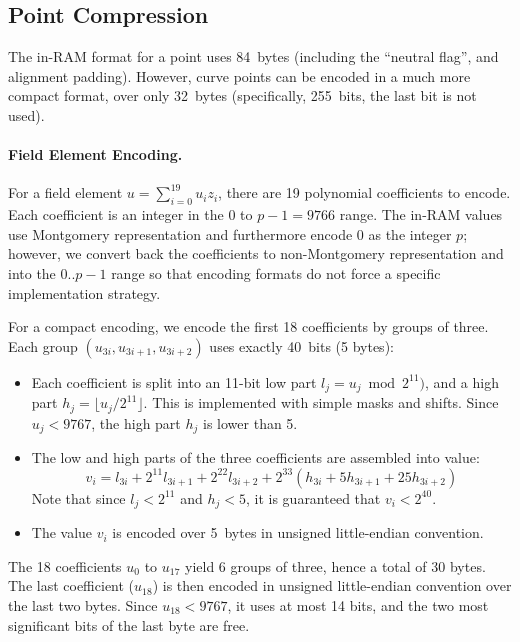 \documentclass{llncs}
\begin{document}
\subsection{Point Compression}

The in-RAM format for a point uses 84~bytes (including the ``neutral
flag'', and alignment padding). However, curve points can be encoded in
a much more compact format, over only 32~bytes (specifically, 255~bits,
the last bit is not used).

\paragraph{Field Element Encoding.}

For a field element $u = \sum_{i=0}^{19} u_i z_i$, there are 19
polynomial coefficients to encode. Each coefficient is an integer in
the $0$ to $p-1 = 9766$ range. The in-RAM values use Montgomery
representation and furthermore encode 0 as the integer $p$; however,
we convert back the coefficients to non-Montgomery representation and
into the $0$..$p-1$ range so that encoding formats do not force a
specific implementation strategy.

For a compact encoding, we encode the first 18 coefficients by groups of
three. Each group $(u_{3i}, u_{3i+1}, u_{3i+2})$ uses exactly 40~bits (5
bytes):
\begin{itemize}

    \item Each coefficient is split into an 11-bit low part $l_j = u_j
    \bmod 2^{11})$, and a high part $h_j = \lfloor u_j / 2^{11}
    \rfloor$. This is implemented with simple masks and shifts. Since
    $u_j < 9767$, the high part $h_j$ is lower than 5.

    \item The low and high parts of the three coefficients are assembled
    into value:
    \begin{equation*}
        v_i = l_{3i} + 2^{11} l_{3i+1} + 2^{22} l_{3i+2}
              + 2^{33} (h_{3i} + 5 h_{3i+1} + 25 h_{3i+2})
    \end{equation*}
    Note that since $l_j < 2^{11}$ and $h_j < 5$, it is guaranteed that
    $v_i < 2^{40}$.

    \item The value $v_i$ is encoded over 5~bytes in unsigned little-endian
    convention.

\end{itemize}
The 18 coefficients $u_0$ to $u_{17}$ yield 6 groups of three, hence a
total of 30 bytes. The last coefficient ($u_{18}$) is then encoded in
unsigned little-endian convention over the last two bytes. Since
$u_{18} < 9767$, it uses at most 14 bits, and the two most significant
bits of the last byte are free.
\end{document}
